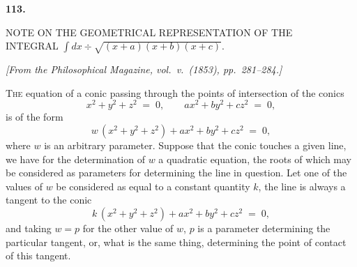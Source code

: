 \documentclass[11pt]{article}
\begin{document}
\clearpage


\begin{center}\textbf{113.}\par\medskip
{\large NOTE ON THE GEOMETRICAL REPRESENTATION OF THE\\
INTEGRAL $\displaystyle\int\!dx\div\!\sqrt{(x+a)(x+b)(x+c)}$.}
\end{center}

\noindent\emph{[From the Philosophical Magazine, vol.\ v.\ (1853), pp.\ 281--284.]}

\bigskip

\noindent\textsc{The} equation of a conic passing through the points of intersection of the conics
\[
x^{2} + y^{2} + z^{2} \;=\; 0,\qquad a x^{2} + b y^{2} + c z^{2} \;=\; 0,
\]
is of the form
\[
w\,(x^{2} + y^{2} + z^{2}) + a x^{2} + b y^{2} + c z^{2} \;=\; 0,
\]
where $w$ is an arbitrary parameter. Suppose that the conic touches a given line, we have for the determination of $w$ a quadratic equation, the roots of which may be considered as parameters for determining the line in question. Let one of the values of $w$ be considered as equal to a constant quantity $k$, the line is always a tangent to the conic
\[
k\,(x^{2} + y^{2} + z^{2}) + a x^{2} + b y^{2} + c z^{2} \;=\; 0,
\]
and taking $w = p$ for the other value of $w$, $p$ is a parameter determining the particular tangent, or, what is the same thing, determining the point of contact of this tangent.
\end{document}
